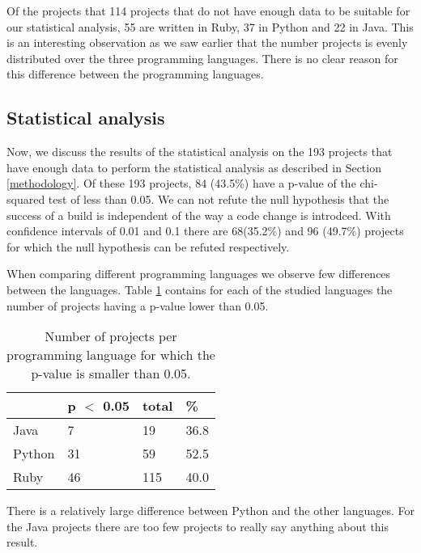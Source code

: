 Of the projects that 114 projects that do not have enough data to be suitable for our statistical analysis, 55 are written in Ruby, 37 in Python and 22 in Java.
This is an interesting observation as we saw earlier that the number projects is evenly distributed over the three programming languages.
There is no clear reason for this difference between the programming languages.

\subsection{Statistical analysis}

Now, we discuss the results of the statistical analysis on the 193 projects that have enough data to perform the statistical analysis as described in Section \ref{methodology}.
Of these 193 projects, 84 (43.5\%) have a p-value of the chi-squared test of less than 0.05. 
We can not refute the null hypothesis that the success of a build is independent of the way a code change is introdced.
With confidence intervals of 0.01 and 0.1 there are 68(35.2\%) and 96 (49.7\%) projects for which the null hypothesis can be refuted respectively.

When comparing different programming languages we observe few differences between the languages.
Table \ref{tab:p-for-lang} contains for each of the studied languages the number of projects having a p-value lower than 0.05.
\begin{table}[h]
\begin{tabular}{ l | l l l}
 & p $<$ 0.05 & total & \%\\
\hline
Java & 7 & 19 & 36.8\\
Python & 31 & 59 & 52.5 \\
Ruby & 46 & 115 & 40.0
\end{tabular}
\caption{Number of projects per programming language for which the p-value is smaller than 0.05.}
\label{tab:p-for-lang}
\end{table}
There is a relatively large difference between Python and the other languages. 
For the Java projects there are too few projects to really say anything about this result.

